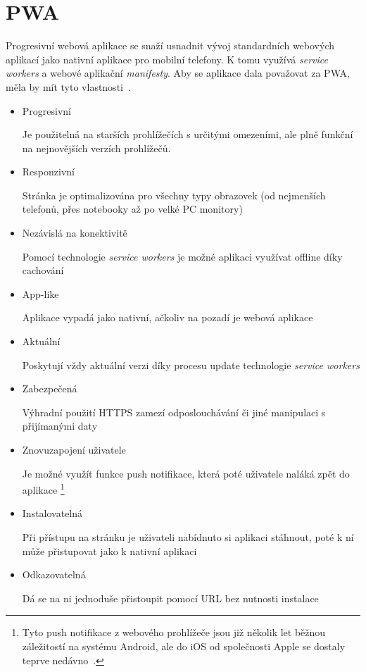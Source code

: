 \section{PWA}

Progresivní webová aplikace se snaží usnadnit vývoj standardních webových aplikací jako nativní aplikace pro mobilní telefony.
K tomu využívá \emph{service workers} a webové aplikační \emph{manifesty}. Aby se aplikace dala považovat za PWA, měla by
mít tyto vlastnosti~\cite{PWAMDN,PWAAckee}.


\begin{itemize}
    \item Progresivní

    Je použitelná na starších prohlížečích s určitými omezeními, ale plně funkční na nejnovějších verzích prohlížečů.
    \item Responzivní

    Stránka je optimalizována pro všechny typy obrazovek (od nejmenších telefonů, přes notebooky až po velké PC monitory)
    \item Nezávislá na konektivitě

    Pomocí technologie \emph{service workers} je možné aplikaci využívat offline díky cachování
    \item App-like

    Aplikace vypadá jako nativní, ačkoliv na pozadí je webová aplikace
    \item Aktuální

    Poskytují vždy aktuální verzi díky procesu update technologie \emph{service workers}
    \item Zabezpečená

    Výhradní použití HTTPS zamezí odposlouchávání či jiné manipulaci s přijímanými daty
    \item Znovuzapojení uživatele

    Je možné využít funkce push notifikace, která poté uživatele naláká zpět do aplikace \footnote{Tyto push notifikace z webového prohlížeče jsou již několik let běžnou
    záležitostí na systému Android, ale do iOS od společnosti Apple se dostaly teprve nedávno~\cite{PWANotifications}.}
    \item Instalovatelná

    Při přístupu na stránku je uživateli nabídnuto si aplikaci stáhnout, poté k ní může přistupovat jako k nativní aplikaci
    \item Odkazovatelná

    Dá se na ni jednoduše přistoupit pomocí URL bez nutnosti instalace
\end{itemize}
